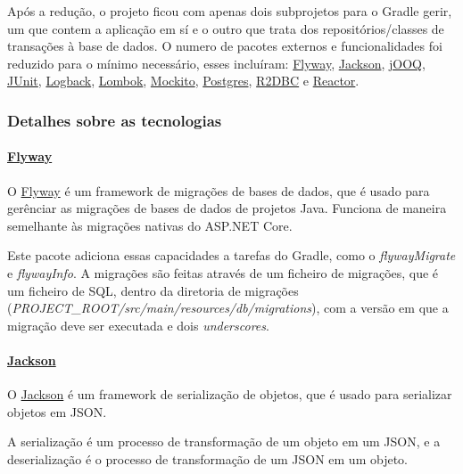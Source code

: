 Após a redução, o projeto ficou com apenas dois subprojetos para o Gradle gerir, um que contem a aplicação em sí e o outro que trata dos repositórios/classes de transações à base de dados. O numero de pacotes externos e funcionalidades foi reduzido para o mínimo necessário, esses incluíram: \href{https://flywaydb.org/}{Flyway}, \href{http://fasterxml.com/}{Jackson}, \href{https://www.jooq.org/}{jOOQ}, \href{https://junit.org/junit5/}{JUnit}, \href{https://logback.qos.ch/}{Logback}, \href{https://projectlombok.org/}{Lombok}, \href{https://site.mockito.org/}{Mockito}, \href{https://jdbc.postgresql.org/}{Postgres}, \href{https://r2dbc.io/}{R2DBC} e \href{https://projectreactor.io/}{Reactor}.

\subsubsection{Detalhes sobre as tecnologias}

\paragraph{\href{https://flywaydb.org/}{Flyway}\\}

O \href{https://flywaydb.org/}{Flyway} é um framework de migrações de bases de dados, que é usado para gerênciar as migrações de bases de dados de projetos Java. Funciona de maneira semelhante às migrações nativas do ASP.NET Core.\cite{flyway}

Este pacote adiciona essas capacidades a tarefas do Gradle, como o \textit{flywayMigrate} e \textit{flywayInfo}. A migrações são feitas através de um ficheiro de migrações, que é um ficheiro de SQL, dentro da diretoria de migrações (\textit{PROJECT\_ROOT/src/main/resources/db/migrations}), com a versão em que a migração deve ser executada e dois \textit{underscores}.

\paragraph{\href{http://fasterxml.com/}{Jackson}\\}

O \href{http://fasterxml.com/}{Jackson} é um framework de serialização de objetos, que é usado para serializar objetos em JSON.\cite{jackson}

A serialização é um processo de transformação de um objeto em um JSON, e a deserialização é o processo de transformação de um JSON em um objeto.

